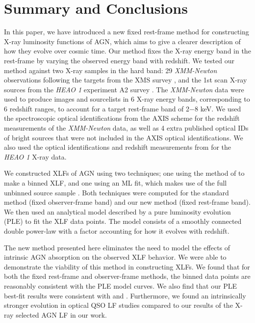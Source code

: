 \documentclass[fleqn,usenatbib]{mnras}
\begin{document}
\section{Summary and Conclusions}\label{sec:conclusions}

In this paper, we have introduced a new fixed rest-frame method for constructing X-ray luminosity functions of AGN, which aims to give a clearer description of how they evolve over cosmic time.
Our method fixes the X-ray energy band in the rest-frame by varying the observed energy band with redshift.
We tested our method against two X-ray samples in the hard band: 29 \textit{XMM-Newton} observations following the targets from the XMS survey \citep{barcons2007xmm}, and the 1st scan X-ray sources from the \textit{HEAO 1} experiment A2 survey \citep{piccinotti1982heao1xlf}.
The \textit{XMM-Newton} data were used to produce images and sourcelists in 6 X-ray energy bands, corresponding to 6 redshift ranges, to account for a target rest-frame band of 2$-$8 keV.
We used the spectroscopic optical identifications from the AXIS scheme for the redshift measurements of the \textit{XMM-Newton} data, as well as 4 extra published optical IDs of bright sources that were not included in the AXIS optical identifications.
We also used the optical identifications and redshift measurements from \cite{piccinotti1982heao1xlf} for the \textit{HEAO 1} X-ray data.

We constructed XLFs of AGN using two techniques; one using the method of \cite{page2000improved} to make a binned XLF, and one using an ML fit, which makes use of the full unbinned source sample \citep{page2021uvlf}. 
Both techniques were computed for the standard method (fixed observer-frame band) and our new method (fixed rest-frame band). 
We then used an analytical model described by a pure luminosity evolution (PLE) to fit the XLF data points. 
The model consists of a smoothly connected double power-law with a factor accounting for how it evolves with redshift.

The new method presented here eliminates the need to model the effects of intrinsic AGN absorption on the observed XLF behavior.
We were able to demonstrate the viability of this method in constructing XLFs.
We found that for both the fixed rest-frame and observer-frame methods, the binned data points are reasonably consistent with the PLE model curves.
We also find that our PLE best-fit results were consistent with \cite{ebrero2009xmm} and \cite{ueda2003hardxlf}.
Furthermore, we found an intrinsically stronger evolution in optical QSO LF studies \citep{ross2013quasarlf, croom2004qso, croom2009sdss} compared to our results of the X-ray selected AGN LF in our work.
\end{document}
